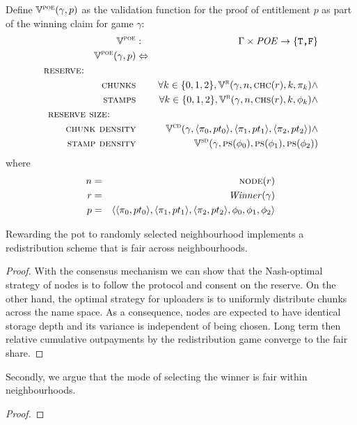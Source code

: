 \begin{definition}
\label{def:claim-validation}
%
Define $\mathbb{V}^{\textsc{poe}}(\gamma, p)$ as the validation function for the proof of entitlement $p$ as part of the winning claim for game $\gamma$:
%
\begin{eqnarray}
\validator{poe}&:&\Gamma\times\mathit{POE}\to\{\texttt{T,F}\}\\
\validator{poe}(\gamma, p) &\Leftrightarrow\\
%
\textsc{reserve:\ \ \ \ \ \ \ \ \ \ \ \ \ \ }\\
\textsc{chunks}
&&\forall k\in\{0,1,2\},\validator{r}(\gamma,n,\textsc{chc}(r),k,\pi_k)\land\\
\textsc{stamps}
&&\forall k\in\{0,1,2\}, \validator{r}(\gamma,n,\textsc{chs}(r),k,\phi_k)\land\\
\textsc{reserve size:\ \ \ \ \ \ \ }\\
\textsc{chunk density}&&\validator{cd}(\gamma, \langle \pi_0,pt_0\rangle, \langle \pi_1,pt_1\rangle, \langle \pi_2,pt_2\rangle)\land\\
%
\textsc{stamp density}&&
\validator{sd}(\gamma,\textsc{ps}(\phi_0),\textsc{ps}(\phi_1),\textsc{ps}(\phi_2))
\end{eqnarray}
where
\begin{eqnarray}
n&=& \textsc{node}(r)\\
r&=& \mathit{Winner}(\gamma)\\
p &= &\langle\langle \pi_0,pt_0\rangle, \langle \pi_1,pt_1\rangle,\langle \pi_2,pt_2\rangle,\phi_0,\phi_1,\phi_2\rangle
\end{eqnarray}
\end{definition}



\begin{corollary}
Rewarding the pot to randomly selected neighbourhood implements a  redistribution scheme that is fair across neighbourhoods.
\begin{proof}
With the consensus mechanism we can show that the Nash-optimal strategy of nodes is to follow the protocol and consent on the reserve. On the other hand, the optimal strategy for uploaders is to uniformly distribute chunks across the name space. As a consequence, nodes are expected to have identical storage depth and its variance is independent of being chosen. Long term then relative cumulative outpayments by the redistribution game converge to the fair share.
\end{proof}

Secondly, we argue that the mode of selecting the winner is fair within neighbourhoods. 
\begin{proof}
    
\end{proof}
\end{corollary}

